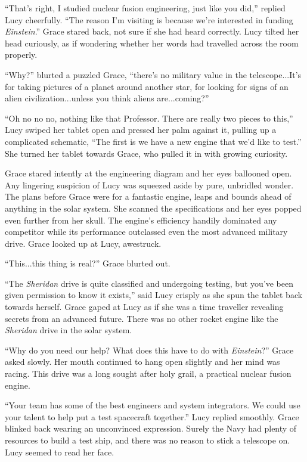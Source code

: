 \documentclass[openany, 12pt]{book} %
\begin{document}
``That's right, I studied nuclear fusion engineering, just like you did,'' replied Lucy cheerfully. ``The reason I'm visiting is because we're interested in funding \textit{Einstein}.'' Grace stared back, not sure if she had heard correctly. Lucy tilted her head curiously, as if wondering whether her words had travelled across the room properly.

``Why?'' blurted a puzzled Grace, ``there's no military value in the telescope...It's for taking pictures of a planet around another star, for looking for signs of an alien civilization...unless you think aliens are...coming?''

``Oh no no no, nothing like that Professor. There are really two pieces to this,'' Lucy swiped her tablet open and pressed her palm against it, pulling up a complicated schematic, ``The first is we have a new engine that we'd like to test.'' She turned her tablet towards Grace, who pulled it in with growing curiosity.

Grace stared intently at the engineering diagram and her eyes ballooned open. Any lingering suspicion of Lucy was squeezed aside by pure, unbridled wonder. The plans before Grace were for a fantastic engine, leaps and bounds ahead of anything in the solar system. She scanned the specifications and her eyes popped even further from her skull. The engine's efficiency handily dominated any competitor while its performance outclassed even the most advanced military drive. Grace looked up at Lucy, awestruck.

``This...this thing is real?'' Grace blurted out.

``The \textit{Sheridan} drive is quite classified and undergoing testing, but you've been given permission to know it exists,'' said Lucy crisply as she spun the tablet back towards herself. Grace gaped at Lucy as if she was a time traveller revealing secrets from an advanced future. There was no other rocket engine like the \textit{Sheridan} drive in the solar system.

``Why do you need our help? What does this have to do with \textit{Einstein}?'' Grace asked slowly. Her mouth continued to hang open slightly and her mind was racing. This drive was a long sought after holy grail, a practical nuclear fusion engine.

``Your team has some of the best engineers and system integrators. We could use your talent to help put a test spacecraft together.'' Lucy replied smoothly. Grace blinked back wearing an unconvinced expression. Surely the Navy had plenty of resources to build a test ship, and there was no reason to stick a telescope on. Lucy seemed to read her face.
\end{document}
